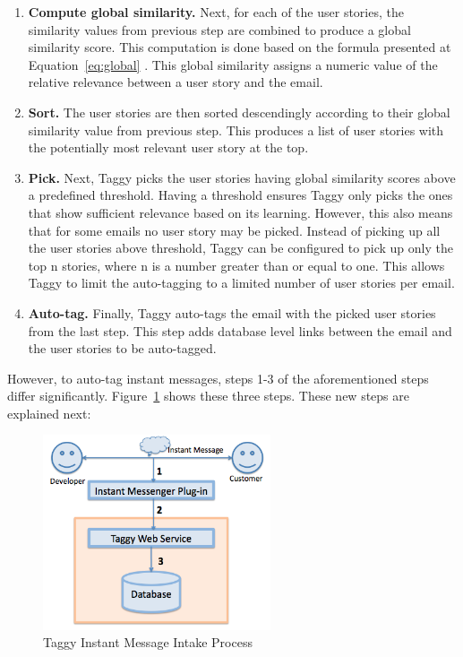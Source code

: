 \begin{enumerate}
	\item \textbf{Compute global similarity.} Next, for each of the user stories, the similarity values from previous step are combined to produce a global similarity score. This computation is done based on the formula presented at Equation~\ref{eq:global} . This global similarity assigns a numeric value of the relative relevance between a user story and the email.
	
	\item \textbf{Sort.} The user stories are then sorted descendingly according to their global similarity value from previous step. This produces a list of user stories with the potentially most relevant user story at the top.
	
	\item \textbf{Pick.} Next, Taggy picks the user stories having global similarity scores above a predefined threshold. Having a threshold ensures Taggy only picks the ones that show sufficient relevance based on its learning. However, this also means that for some emails no user story may be picked. Instead of picking up all the user stories above threshold, Taggy can be configured to pick up only the top n stories, where n is a number greater than or equal to one. This allows Taggy to limit the auto-tagging to a limited number of user stories per email.
	
	\item \textbf{Auto-tag.}	Finally, Taggy auto-tags the email with the picked user stories from the last step. This step adds database level links between the email and the user stories to be auto-tagged.
\end{enumerate}

However, to auto-tag instant messages, steps 1-3 of the aforementioned steps differ significantly. Figure~\ref{fig:im_intake} shows these three steps. These new steps are explained next:

\begin{figure}[!h]
	\centering
	\includegraphics[width=0.6\textwidth]{im_intake.png}
	\caption{Taggy Instant Message Intake Process}
	\label{fig:im_intake}
\end{figure}


